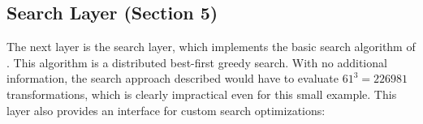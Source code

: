 \subsection{Search Layer (Section 5)} The next layer is the search layer, which implements the basic search algorithm of \sys. This algorithm is a distributed best-first greedy search.  
With no additional information, the search approach described would have to evaluate $61^3 = 226981$ transformations, which is clearly impractical even for this small example.
This layer also provides an interface for custom search optimizations:

\fi

